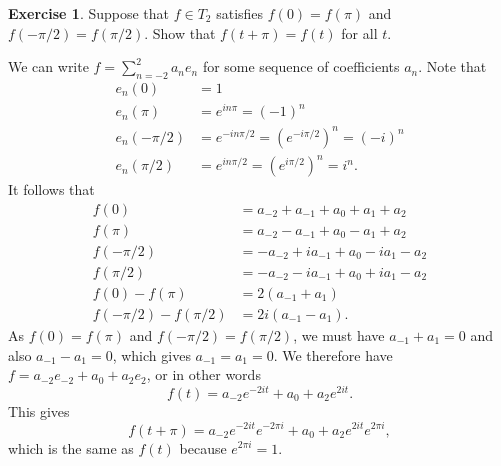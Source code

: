 \documentclass{amsart}
\renewcommand{\:}       {\colon}
\theoremstyle{definition}
\newtheorem{exercise}{Exercise}[section]
\renewenvironment{solution}{\SolutionAtEnd}{\endSolutionAtEnd}
\begin{document}
\begin{exercise}\label{ex-pi-period}
 Suppose that $f\in T_2$ satisfies $f(0)=f(\pi)$ and
 $f(-\pi/2)=f(\pi/2)$.  Show that $f(t+\pi)=f(t)$ for all $t$.
\end{exercise}
\begin{solution}
 We can write $f=\sum_{n=-2}^2a_ne_n$ for some sequence of
 coefficients $a_n$.  Note that 
 \begin{align*}
  e_n(0) &= 1 \\
  e_n(\pi) &= e^{in\pi} = (-1)^n \\
  e_n(-\pi/2) &= e^{-in\pi/2} = (e^{-i\pi/2})^n = (-i)^n \\
  e_n(\pi/2) &= e^{in\pi/2} = (e^{i\pi/2})^n = i^n.
 \end{align*}
 It follows that 
 \begin{align*}
  f(0)      &= a_{-2} + a_{-1} + a_0 + a_1 + a_2 \\
  f(\pi)    &= a_{-2} - a_{-1} + a_0 - a_1 + a_2 \\
  f(-\pi/2) &= -a_{-2} + ia_{-1} + a_0 - ia_1 - a_2 \\
  f(\pi/2)  &= -a_{-2} - ia_{-1} + a_0 + ia_1 - a_2 \\
  f(0)-f(\pi) &= 2(a_{-1}+a_1) \\
  f(-\pi/2)-f(\pi/2) &= 2i(a_{-1}-a_1). 
 \end{align*}
 As $f(0)=f(\pi)$ and $f(-\pi/2)=f(\pi/2)$, we must have
 $a_{-1}+a_1=0$ and also $a_{-1}-a_1=0$, which gives $a_{-1}=a_1=0$.
 We therefore have $f=a_{-2}e_{-2}+a_0+a_2e_2$, or in other words
 \[ f(t) = a_{-2} e^{-2it} + a_0 + a_2 e^{2it}. \]
 This gives 
 \[ f(t+\pi) = 
  a_{-2} e^{-2it}e^{-2\pi i} + a_0 + a_2 e^{2it} e^{2\pi i},
 \]
 which is the same as $f(t)$ because $e^{2\pi i}=1$.
\end{solution}
\end{document}
